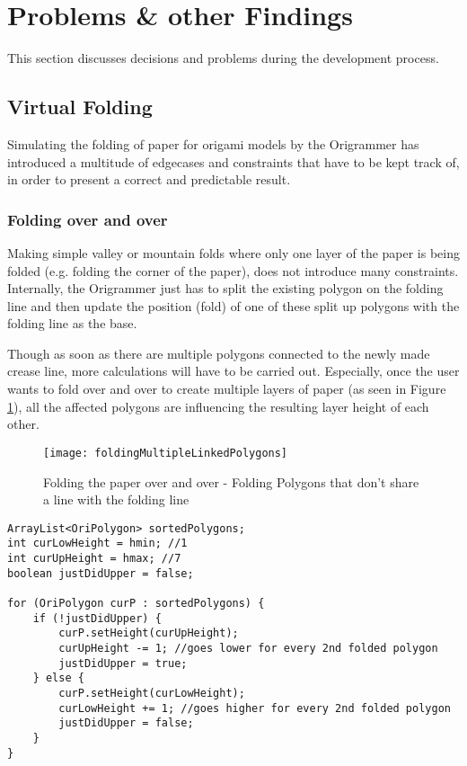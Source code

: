 
\section{Problems \& other Findings}
\label{sec:problems}

This section discusses decisions and problems during the development process.


\subsection{Virtual Folding}

Simulating the folding of paper for origami models by the Origrammer has introduced a multitude of edgecases and constraints that have to be kept track of, in order to present a correct and predictable result.

\subsubsection{Folding over and over}

Making simple valley or mountain folds where only one layer of the paper is being folded (e.g. folding the corner of the paper), does not introduce many constraints. Internally, the Origrammer just has to split the existing polygon on the folding line and then update the position (fold) of one of these split up polygons with the folding line as the base.

Though as soon as there are multiple polygons connected to the newly made crease line, more calculations will have to be carried out. Especially, once the user wants to fold over and over to create multiple layers of paper (as seen in Figure \ref{fig:foldingMultipleLinkedPolygons}), all the affected polygons are influencing the resulting layer height of each other.
\begin{figure}[htbp]
	\centering
	\texttt{[image: foldingMultipleLinkedPolygons]}
	\caption{Folding the paper over and over - Folding Polygons that don't share a line with the folding line}
	\label{fig:foldingMultipleLinkedPolygons}
\end{figure}


\begin{lstlisting}[label=oriPolygon,caption=OriPolygon]
ArrayList<OriPolygon> sortedPolygons;
int curLowHeight = hmin; //1
int curUpHeight = hmax; //7
boolean justDidUpper = false;

for (OriPolygon curP : sortedPolygons) {
    if (!justDidUpper) {
        curP.setHeight(curUpHeight);
        curUpHeight -= 1; //goes lower for every 2nd folded polygon
        justDidUpper = true;
    } else {
        curP.setHeight(curLowHeight);
        curLowHeight += 1; //goes higher for every 2nd folded polygon
        justDidUpper = false;
    }
}
\end{lstlisting}




